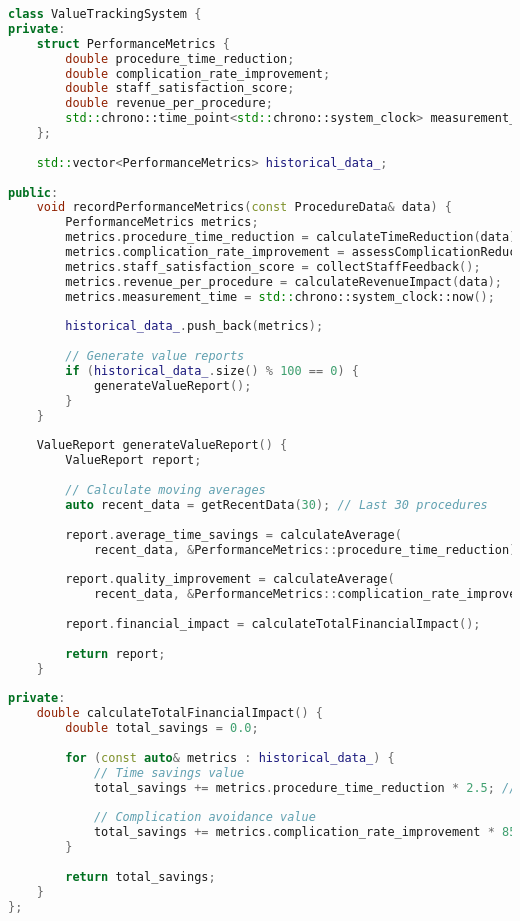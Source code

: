 \begin{lstlisting}[language=C++, caption={Value Tracking System}, label={lst:value-tracking}]
class ValueTrackingSystem {
private:
    struct PerformanceMetrics {
        double procedure_time_reduction;
        double complication_rate_improvement;
        double staff_satisfaction_score;
        double revenue_per_procedure;
        std::chrono::time_point<std::chrono::system_clock> measurement_time;
    };
    
    std::vector<PerformanceMetrics> historical_data_;
    
public:
    void recordPerformanceMetrics(const ProcedureData& data) {
        PerformanceMetrics metrics;
        metrics.procedure_time_reduction = calculateTimeReduction(data);
        metrics.complication_rate_improvement = assessComplicationReduction(data);
        metrics.staff_satisfaction_score = collectStaffFeedback();
        metrics.revenue_per_procedure = calculateRevenueImpact(data);
        metrics.measurement_time = std::chrono::system_clock::now();
        
        historical_data_.push_back(metrics);
        
        // Generate value reports
        if (historical_data_.size() % 100 == 0) {
            generateValueReport();
        }
    }
    
    ValueReport generateValueReport() {
        ValueReport report;
        
        // Calculate moving averages
        auto recent_data = getRecentData(30); // Last 30 procedures
        
        report.average_time_savings = calculateAverage(
            recent_data, &PerformanceMetrics::procedure_time_reduction);
        
        report.quality_improvement = calculateAverage(
            recent_data, &PerformanceMetrics::complication_rate_improvement);
        
        report.financial_impact = calculateTotalFinancialImpact();
        
        return report;
    }
    
private:
    double calculateTotalFinancialImpact() {
        double total_savings = 0.0;
        
        for (const auto& metrics : historical_data_) {
            // Time savings value
            total_savings += metrics.procedure_time_reduction * 2.5; // $2.5/min
            
            // Complication avoidance value
            total_savings += metrics.complication_rate_improvement * 8500; // $8,500 per complication
        }
        
        return total_savings;
    }
};
\end{lstlisting}


